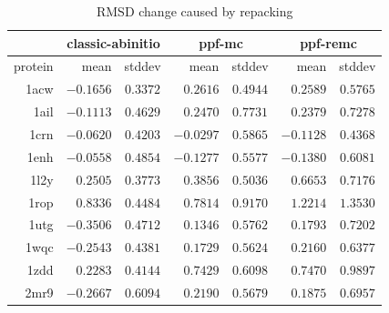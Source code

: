 \begin{table}
  \centering
  \begin{tabular}{r|r|c||r|c||r|c}
            & \multicolumn{2}{c}{classic-abinitio} & \multicolumn{2}{||c}{ppf-mc} & \multicolumn{2}{||c}{ppf-remc} \\ \hline
    protein & mean      & stddev   & mean      & stddev   & mean      & stddev   \\ \hline \hline
    1acw    & $-0.1656$ & $0.3372$ & $0.2616$  & $0.4944$ & $0.2589$  & $0.5765$ \\ \hline
    1ail    & $-0.1113$ & $0.4629$ & $0.2470$  & $0.7731$ & $0.2379$  & $0.7278$ \\ \hline
    1crn    & $-0.0620$ & $0.4203$ & $-0.0297$ & $0.5865$ & $-0.1128$ & $0.4368$ \\ \hline
    1enh    & $-0.0558$ & $0.4854$ & $-0.1277$ & $0.5577$ & $-0.1380$ & $0.6081$ \\ \hline
    1l2y    & $0.2505$  & $0.3773$ & $0.3856$  & $0.5036$ & $0.6653$  & $0.7176$ \\ \hline
    1rop    & $0.8336$  & $0.4484$ & $0.7814$  & $0.9170$ & $1.2214$  & $1.3530$ \\ \hline
    1utg    & $-0.3506$ & $0.4712$ & $0.1346$  & $0.5762$ & $0.1793$  & $0.7202$ \\ \hline
    1wqc    & $-0.2543$ & $0.4381$ & $0.1729$  & $0.5624$ & $0.2160$  & $0.6377$ \\ \hline
    1zdd    & $0.2283$  & $0.4144$ & $0.7429$  & $0.6098$ & $0.7470$  & $0.9897$ \\ \hline
    2mr9    & $-0.2667$ & $0.6094$ & $0.2190$  & $0.5679$ & $0.1875$  & $0.6957$ \\ \hline
  \end{tabular}
  \caption{RMSD change caused by repacking}
  \label{tab:repack-impact-rmsd}
\end{table}

